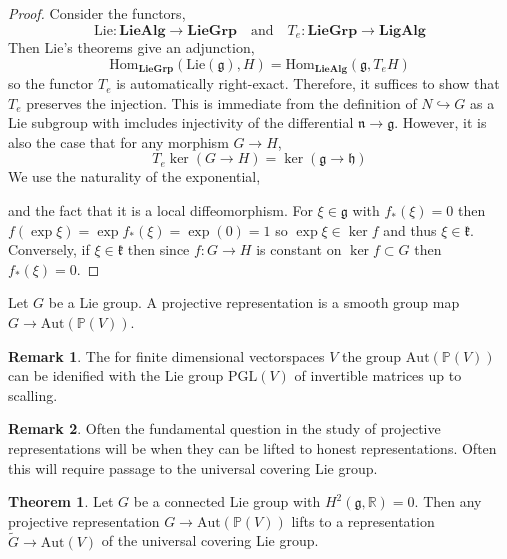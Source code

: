 \documentclass[12pt]{extarticle}
\newcommand{\Hom}[3]{\mathrm{Hom}_{#1}\left( #2, #3 \right)}
\newcommand{\R}{\mathbb{R}}
\theoremstyle{definition}
\newtheorem{theorem}{Theorem}[section]
\newtheorem{remark}{Remark}
\newenvironment{definition}[1][Definition:]{\begin{trivlist}
\item[\hskip \labelsep {\bfseries #1}]}{\end{trivlist}}
\newcommand{\PGL}[1]{\mathrm{PGL}\left(#1\right)}
\newcommand{\g}{\mathfrak{g}}
\newcommand{\h}{\mathfrak{h}}
\newcommand{\Lie}[1]{\mathrm{Lie}\left(#1 \right)}
\newcommand{\Aut}[1]{\mathrm{Aut}\left(#1 \right)}
\renewcommand{\P}{\mathbb{P}}
\newcommand{\embed}{\hookrightarrow}
\begin{document}
\begin{proof}
Consider the functors,
\[ \mathrm{Lie} : \mathbf{LieAlg} \to \mathbf{LieGrp}\quad \text{and} \quad T_e : \mathbf{LieGrp} \to \mathbf{LigAlg} \]
Then Lie's theorems give an adjunction,
\[ \Hom{\mathbf{LieGrp}}{\Lie{\g}}{H} = \Hom{\mathbf{LieAlg}}{\g}{T_e H} \]
so the functor $T_e$ is automatically right-exact. Therefore, it suffices to show that $T_e$ preserves the injection. This is immediate from the definition of $N \embed G$ as a Lie subgroup with imcludes injectivity of the differential $\mathfrak{n} \to \g$. However, it is also the case that for any morphism $G \to H$,
\[ T_e \ker{(G \to H)} = \ker{(\g \to \h)} \] 
We use the naturality of the exponential,
\begin{center}
\end{center}
and the fact that it is a local diffeomorphism. For $\xi \in \g$ with $f_*(\xi) = 0$ then $f(\exp{\xi}) = \exp{f_*(\xi)} = \exp{(0)} = 1$ so $\exp{\xi} \in \ker{f}$ and thus $\xi \in \mathfrak{k}$. Conversely, if $\xi \in \mathfrak{k}$ then since $f : G \to H$ is constant on $\ker{f} \subset G$ then $f_*(\xi) = 0$.  
\end{proof}

\begin{definition}
Let $G$ be a Lie group. A projective representation is a smooth group map $G \to \Aut{\P(V)}$. 
\end{definition}

\begin{remark}
The for finite dimensional vectorspaces $V$ the group $\Aut{\P(V)}$ can be idenified with the Lie group $\PGL{V}$ of invertible matrices up to scalling. 
\end{remark}

\begin{remark}
Often the fundamental question in the study of projective representations will be when they can be lifted to honest representations. Often this will require passage to the universal covering Lie group. 
\end{remark}

\begin{theorem}
Let $G$ be a connected Lie group with $H^2(\g, \R) = 0$. Then any projective representation $G \to \Aut{\P(V)}$ lifts to a representation $\tilde{G} \to \Aut{V}$ of the universal covering Lie group. 
\end{theorem}
\end{document}
